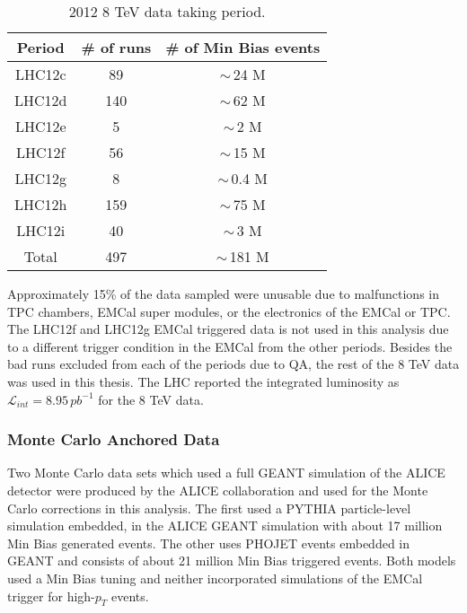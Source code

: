\begin{table}[hb]
\label{tab:RunSummary}
\begin{center}
\caption{2012 8 TeV data taking period.}
\begin{tabular}[b]{|c|c|c|}
	\hline
	Period & \# of runs & \# of Min Bias events \\ \hline
	LHC12c & 89 & $\sim \,$24 M \\ \hline
	LHC12d & 140 & $\sim \,$62 M \\ \hline
	LHC12e & 5 & $\sim \,$2 M \\ \hline
	LHC12f & 56 & $\sim \,$15 M \\ \hline
	LHC12g & 8 & $\sim \,$0.4 M \\ \hline
	LHC12h & 159 & $\sim \,$75 M \\ \hline
	LHC12i & 40 & $\sim \,$3 M \\ \hline
	Total & 497 & $\sim \,$181 M \\ \hline

\end{tabular}
\end{center}

\end{table}

Approximately 15\% of the data sampled were unusable due to malfunctions in TPC chambers, EMCal super modules, or the electronics of the EMCal or TPC.  The LHC12f and LHC12g EMCal triggered data is not used in this analysis due to a different trigger condition in the EMCal from the other periods.  Besides the bad runs excluded from each of the periods due to QA, the rest of the 8 TeV data was used in this thesis.  The LHC reported the integrated luminosity as $\mathscr{L}_{int} = 8.95 \, pb^{-1}$ for the 8 TeV data\cite{ALICE-PUBLIC-2017-002}.

\subsubsection{Monte Carlo Anchored Data}
Two Monte Carlo data sets which used a full GEANT simulation of the ALICE detector were produced by the ALICE collaboration and used for the Monte Carlo corrections in this analysis.   The first used a PYTHIA particle-level simulation embedded, in the ALICE GEANT simulation with about 17 million Min Bias generated events. The other uses PHOJET events embedded in GEANT and consists of about 21 million Min Bias triggered events.  Both models used a Min Bias tuning and neither incorporated simulations of the EMCal trigger for high-$p_{T}$ events.

